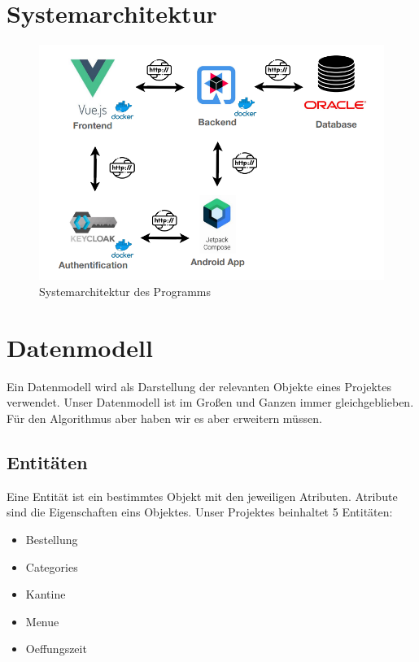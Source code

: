 \section {Systemarchitektur}
\author{Benjamin Besic}

\begin{figure}[htp]
    \centering
    \author{David Ignjatovic}
    \includegraphics[scale=0.7]{pics/final-sys-arc.PNG}
    \caption{Systemarchitektur des Programms}
    \label{fig:impl:SysArc}
\end{figure}

\section{Datenmodell}
\author{David Ignjatovic}

Ein Datenmodell wird als Darstellung der relevanten Objekte eines Projektes verwendet. 
Unser Datenmodell ist im Großen und Ganzen immer gleichgeblieben. Für den Algorithmus aber haben wir es aber erweitern müssen.

\subsection{Entitäten}

Eine Entität ist ein bestimmtes Objekt mit den jeweiligen Atributen. Atribute sind die Eigenschaften eins Objektes.
Unser Projektes beinhaltet 5 Entitäten:

\begin{itemize}
  \item Bestellung
  \item Categories
  \item Kantine
  \item Menue
  \item Oeffungszeit
\end{itemize}

